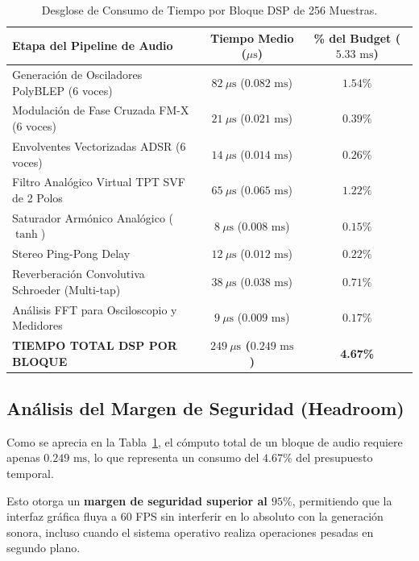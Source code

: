 \documentclass[11pt,a4paper]{article}
\begin{document}
\begin{table}[h!]
\centering
\caption{Desglose de Consumo de Tiempo por Bloque DSP de 256 Muestras.}
\label{tab:dsp_budget}
\vspace{0.2cm}
{\small
\begin{tabular}{lcc}
\toprule
\textbf{Etapa del Pipeline de Audio} & \textbf{Tiempo Medio ($\mu\text{s}$)} & \textbf{\% del Budget ($5.33\text{ ms}$)} \\
\midrule
Generación de Osciladores PolyBLEP (6 voces) & $82\ \mu\text{s}$ ($0.082\text{ ms}$) & $1.54\%$ \\
Modulación de Fase Cruzada FM-X (6 voces) & $21\ \mu\text{s}$ ($0.021\text{ ms}$) & $0.39\%$ \\
Envolventes Vectorizadas ADSR (6 voces) & $14\ \mu\text{s}$ ($0.014\text{ ms}$) & $0.26\%$ \\
Filtro Analógico Virtual TPT SVF de 2 Polos & $65\ \mu\text{s}$ ($0.065\text{ ms}$) & $1.22\%$ \\
Saturador Armónico Analógico ($\tanh$) & $8\ \mu\text{s}$ ($0.008\text{ ms}$) & $0.15\%$ \\
Stereo Ping-Pong Delay & $12\ \mu\text{s}$ ($0.012\text{ ms}$) & $0.22\%$ \\
Reverberación Convolutiva Schroeder (Multi-tap) & $38\ \mu\text{s}$ ($0.038\text{ ms}$) & $0.71\%$ \\
Análisis FFT para Osciloscopio y Medidores & $9\ \mu\text{s}$ ($0.009\text{ ms}$) & $0.17\%$ \\
\midrule
\textbf{TIEMPO TOTAL DSP POR BLOQUE} & \textbf{$249\ \mu\text{s}$ ($0.249\text{ ms}$)} & \textbf{4.67\%} \\
\bottomrule
\end{tabular}
}
\end{table}

\subsection{Análisis del Margen de Seguridad (Headroom)}
Como se aprecia en la Tabla~\ref{tab:dsp_budget}, el cómputo total de un bloque de audio requiere apenas \textbf{$0.249\text{ ms}$}, lo que representa un consumo del \textbf{$4.67\%$} del presupuesto temporal. 

Esto otorga un \textbf{margen de seguridad superior al $95\%$}, permitiendo que la interfaz gráfica fluya a 60 FPS sin interferir en lo absoluto con la generación sonora, incluso cuando el sistema operativo realiza operaciones pesadas en segundo plano.
\end{document}
